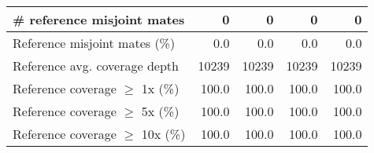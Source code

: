 \documentclass[12pt,a4paper]{article}
\begin{document}
\begin{table}[ht]
\begin{center}
\begin{tabular}{|l*{4}{|r}|}
\# reference misjoint mates & 0 & 0 & 0 & 0 \\ \hline
Reference misjoint mates (\%) & 0.0 & 0.0 & 0.0 & 0.0 \\ \hline
Reference avg. coverage depth & 10239 & 10239 & 10239 & 10239 \\ \hline
Reference coverage $\geq$ 1x (\%) & 100.0 & 100.0 & 100.0 & 100.0 \\ \hline
Reference coverage $\geq$ 5x (\%) & 100.0 & 100.0 & 100.0 & 100.0 \\ \hline
Reference coverage $\geq$ 10x (\%) & 100.0 & 100.0 & 100.0 & 100.0 \\ \hline
\end{tabular}
\end{center}
\end{table}
\end{document}
